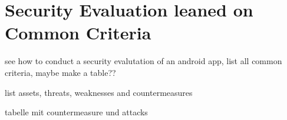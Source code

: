 \section{Security Evaluation leaned on Common Criteria} \label{seceval}
see how to conduct a security evalutation of an android app, list all common criteria, maybe make a table??

list assets, threats, weaknesses and countermeasures

tabelle mit countermeasure und attacks